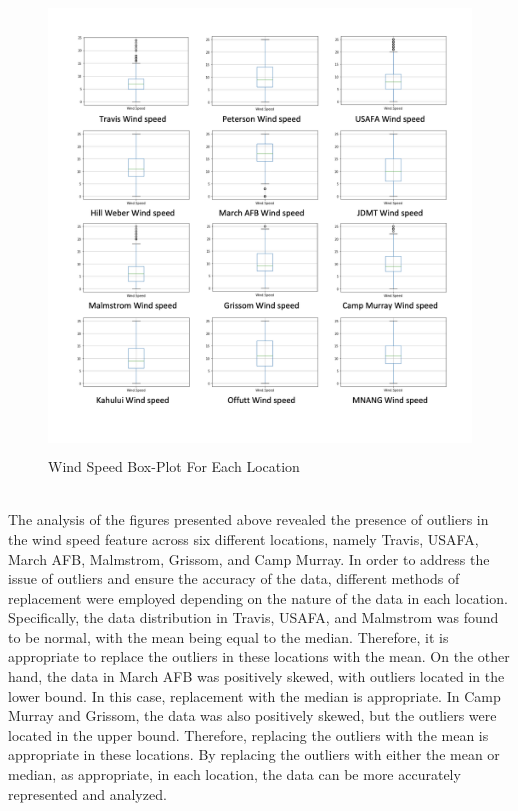 \documentclass{report}
\begin{document}
\begin{figure}[h!]
    \centering
    \includegraphics[width=12cm, height=12cm]{2222.png}
    \caption{Wind Speed Box-Plot For Each Location}
\end{figure}\newpage \hfill \break 
\\
The analysis of the figures presented above revealed the presence of outliers in the wind speed feature across six different locations, namely Travis, USAFA, March AFB, Malmstrom, Grissom, and Camp Murray. In order to address the issue of outliers and ensure the accuracy of the data, different methods of replacement were employed depending on the nature of the data in each location. Specifically, the data distribution in Travis, USAFA, and Malmstrom was found to be normal, with the mean being equal to the median. Therefore, it is appropriate to replace the outliers in these locations with the mean. On the other hand, the data in March AFB was positively skewed, with outliers located in the lower bound. In this case, replacement with the median is appropriate. In Camp Murray and Grissom, the data was also positively skewed, but the outliers were located in the upper bound. Therefore, replacing the outliers with the mean is appropriate in these locations. By replacing the outliers with either the mean or median, as appropriate, in each location, the data can be more accurately represented and analyzed.
\end{document}

